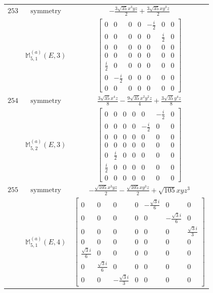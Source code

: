 \documentclass[fleqn,8pt,landscape]{jsarticle}
\begin{document}
\begin{longtable}{ccc}
$ 253 $ & $ \text{symmetry} $ & $ - \frac{3 \sqrt{35} x^{3} y z}{2} + \frac{3 \sqrt{35} x y^{3} z}{2} $ \\
$  $ & $ \mathbb{M}_{5,1}^{(a)}(E,3) $ & $ \begin{bmatrix} 0 & 0 & 0 & 0 & - \frac{i}{2} & 0 & 0 \\ 0 & 0 & 0 & 0 & 0 & \frac{i}{2} & 0 \\ 0 & 0 & 0 & 0 & 0 & 0 & 0 \\ 0 & 0 & 0 & 0 & 0 & 0 & 0 \\ \frac{i}{2} & 0 & 0 & 0 & 0 & 0 & 0 \\ 0 & - \frac{i}{2} & 0 & 0 & 0 & 0 & 0 \\ 0 & 0 & 0 & 0 & 0 & 0 & 0 \end{bmatrix} $ \\ \hline
$ 254 $ & $ \text{symmetry} $ & $ \frac{3 \sqrt{35} x^{4} z}{8} - \frac{9 \sqrt{35} x^{2} y^{2} z}{4} + \frac{3 \sqrt{35} y^{4} z}{8} $ \\
$  $ & $ \mathbb{M}_{5,2}^{(a)}(E,3) $ & $ \begin{bmatrix} 0 & 0 & 0 & 0 & 0 & - \frac{i}{2} & 0 \\ 0 & 0 & 0 & 0 & - \frac{i}{2} & 0 & 0 \\ 0 & 0 & 0 & 0 & 0 & 0 & 0 \\ 0 & 0 & 0 & 0 & 0 & 0 & 0 \\ 0 & \frac{i}{2} & 0 & 0 & 0 & 0 & 0 \\ \frac{i}{2} & 0 & 0 & 0 & 0 & 0 & 0 \\ 0 & 0 & 0 & 0 & 0 & 0 & 0 \end{bmatrix} $ \\ \hline
$ 255 $ & $ \text{symmetry} $ & $ - \frac{\sqrt{105} x^{3} y z}{2} - \frac{\sqrt{105} x y^{3} z}{2} + \sqrt{105} x y z^{3} $ \\
$  $ & $ \mathbb{M}_{5,1}^{(a)}(E,4) $ & $ \begin{bmatrix} 0 & 0 & 0 & 0 & - \frac{\sqrt{3} i}{6} & 0 & 0 \\ 0 & 0 & 0 & 0 & 0 & - \frac{\sqrt{3} i}{6} & 0 \\ 0 & 0 & 0 & 0 & 0 & 0 & \frac{\sqrt{3} i}{3} \\ 0 & 0 & 0 & 0 & 0 & 0 & 0 \\ \frac{\sqrt{3} i}{6} & 0 & 0 & 0 & 0 & 0 & 0 \\ 0 & \frac{\sqrt{3} i}{6} & 0 & 0 & 0 & 0 & 0 \\ 0 & 0 & - \frac{\sqrt{3} i}{3} & 0 & 0 & 0 & 0 \end{bmatrix} $ \\ \hline

\end{longtable}
\end{document}
